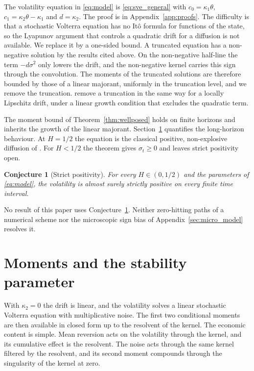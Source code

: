 \documentclass[11pt,a4paper]{article}
\newtheorem{conjecture}[theorem]{Conjecture}
\theoremstyle{definition}
\begin{document}
The volatility equation in \eqref{eq:model} is \eqref{eq:sve_general} with $c_0=\kappa_1\theta$, $c_1=\kappa_2\theta-\kappa_1$ and $d=\kappa_2$. The proof is in Appendix~\ref{app:proofs}. The difficulty is that a stochastic Volterra equation has no It\^o formula for functions of the state, so the Lyapunov argument that controls a quadratic drift for a diffusion is not available. We replace it by a one-sided bound. A truncated equation has a non-negative solution by the results cited above. On the non-negative half-line the term $-d\sigma^2$ only lowers the drift, and the non-negative kernel carries this sign through the convolution. The moments of the truncated solutions are therefore bounded by those of a linear majorant, uniformly in the truncation level, and we remove the truncation.
\citet{PannierJacquier2019} remove a truncation in the same way for a locally Lipschitz drift, under a linear growth condition that excludes the quadratic term.

The moment bound of Theorem~\ref{thm:wellposed} holds on finite horizons and inherits the growth of the linear majorant. Section~\ref{sec:moments} quantifies the long-horizon behaviour. At $H=1/2$ the equation is the classical positive, non-explosive diffusion of \citet{SeppRakhmonov2023}. For $H<1/2$ the theorem gives $\sigma_t\ge0$ and leaves strict positivity open.

\begin{conjecture}[Strict positivity]\label{conj:wellposed}
For every $H\in(0,1/2)$ and the parameters of \eqref{eq:model}, the volatility is almost surely strictly positive on every finite time interval.
\end{conjecture}

No result of this paper uses Conjecture~\ref{conj:wellposed}. Neither zero-hitting paths of a numerical scheme nor the microscopic sign bias of Appendix~\ref{sec:micro_model} resolves it.

\section{Moments and the stability parameter}\label{sec:moments}

With $\kappa_2=0$ the drift is linear, and the volatility solves a linear stochastic Volterra equation with multiplicative noise. The first two conditional moments are then available in closed form up to the resolvent of the kernel. The economic content is simple. Mean reversion acts on the volatility through the kernel, and its cumulative effect is the resolvent. The noise acts through the same kernel filtered by the resolvent, and its second moment compounds through the singularity of the kernel at zero.
\end{document}
